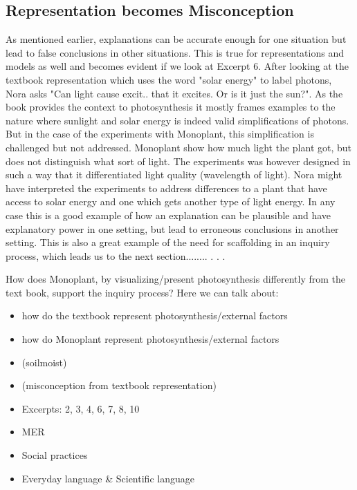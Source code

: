 \subsection{Representation becomes Misconception}
As mentioned earlier, explanations can be accurate enough for one situation but lead to false conclusions in other situations. \citep{smith1994misconceptions} This is true for representations and models as well and becomes evident if we look at Excerpt 6. After looking at the textbook representation which uses the word "solar energy" to label photons, Nora asks "Can light cause excit.. that it excites. Or is it just the sun?". As the book provides the context to photosynthesis it mostly frames examples to the nature where sunlight and solar energy is indeed valid simplifications of photons. But in the case of the experiments with Monoplant, this simplification is challenged but not addressed. Monoplant show how much light the plant got, but does not distinguish what sort of light. The experiments was however designed in such a way that it differentiated light quality (wavelength of light). Nora might have interpreted the experiments to address differences to a plant that have access to solar energy and one which gets another type of light energy. In any case this is a good example of how an explanation can be plausible and have explanatory power in one setting, but lead to erroneous conclusions in another setting. This is also a great example of the need for scaffolding in an inquiry process, which leads us to the next section........ . . . 









How does Monoplant, by visualizing/present photosynthesis differently from the text book, support the inquiry process? 
Here we can talk about: 
\begin{itemize}
\item{how do the textbook represent photosynthesis/external factors}
\item{how do Monoplant represent photosynthesis/external factors}
\item{ (soilmoist)}
\item{ (misconception from textbook representation)}
\item{Excerpts: 2, 3, 4, 6, 7, 8, 10}
\item{MER}
\item{Social practices}
\item{Everyday language \& Scientific language}
\end{itemize}





